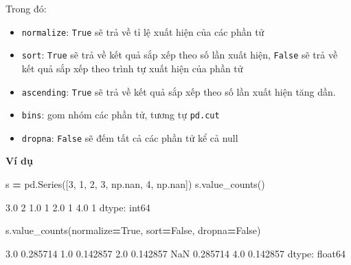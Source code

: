 \documentclass[
]{book}
\newenvironment{Shaded}{\begin{snugshade}}{\end{snugshade}}
\newcommand{\DecValTok}[1]{\textcolor[rgb]{0.00,0.00,0.81}{#1}}
\newcommand{\NormalTok}[1]{#1}
\newcommand{\OperatorTok}[1]{\textcolor[rgb]{0.81,0.36,0.00}{\textbf{#1}}}
\newcommand{\VariableTok}[1]{\textcolor[rgb]{0.00,0.00,0.00}{#1}}
\begin{document}
Trong đó:

\begin{itemize}
\item
  \texttt{normalize}: \texttt{True} sẽ trả về tỉ lệ xuất hiện của các phần tử
\item
  \texttt{sort}: \texttt{True} sẽ trả về kết quả sắp xếp theo số lần xuất hiện, \texttt{False} sẽ trả về kết quả sắp xếp theo trình tự xuất hiện của phần tử
\item
  \texttt{ascending}: \texttt{True} sẽ trả về kết quả sắp xếp theo số lần xuất hiện tăng dần.
\item
  \texttt{bins}: gom nhóm các phần tử, tương tự \texttt{pd.cut}
\item
  \texttt{dropna}: \texttt{False} sẽ đếm tất cả các phần tử kể cả null
\end{itemize}

\textbf{Ví dụ}

\begin{Shaded}
\begin{Highlighting}[]
\NormalTok{s }\OperatorTok{=}\NormalTok{ pd.Series([}\DecValTok{3}\NormalTok{, }\DecValTok{1}\NormalTok{, }\DecValTok{2}\NormalTok{, }\DecValTok{3}\NormalTok{,  np.nan, }\DecValTok{4}\NormalTok{, np.nan])}
\NormalTok{s.value\_counts()}
\end{Highlighting}
\end{Shaded}

\begin{Shaded}
\begin{Highlighting}[]
\NormalTok{3.0    2}
\NormalTok{1.0    1}
\NormalTok{2.0    1}
\NormalTok{4.0    1}
\NormalTok{dtype: int64}
\end{Highlighting}
\end{Shaded}

\begin{Shaded}
\begin{Highlighting}[]
\NormalTok{s.value\_counts(normalize}\OperatorTok{=}\VariableTok{True}\NormalTok{, sort}\OperatorTok{=}\VariableTok{False}\NormalTok{, dropna}\OperatorTok{=}\VariableTok{False}\NormalTok{)}
\end{Highlighting}
\end{Shaded}

\begin{Shaded}
\begin{Highlighting}[]
\NormalTok{3.0    0.285714}
\NormalTok{1.0    0.142857}
\NormalTok{2.0    0.142857}
\NormalTok{NaN    0.285714}
\NormalTok{4.0    0.142857}
\NormalTok{dtype: float64}
\end{Highlighting}
\end{Shaded}
\end{document}
